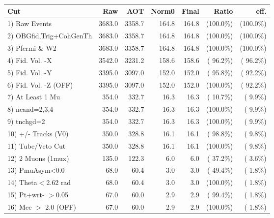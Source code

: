  \begin{table}[h!]\centering
 \begin{tabular}{||l||r|r|r|r|r|r||}
 \hline
 \hline
 Cut & Raw & AOT & Norm0 & Final & Ratio & eff.       \\
 \hline
  1) Raw Events           &       3683.0 &       3358.7 &        164.8 &        164.8 & (100.0\%) & (100.0\%) \\
  2) OBGfid,Trig+CohGenTh &       3683.0 &       3358.7 &        164.8 &        164.8 & (100.0\%) & (100.0\%) \\
  3) Pfermi \& W2         &       3683.0 &       3358.7 &        164.8 &        164.8 & (100.0\%) & (100.0\%) \\
  4) Fid. Vol. -X         &       3542.0 &       3231.2 &        158.6 &        158.6 & ( 96.2\%) & ( 96.2\%) \\
  5) Fid. Vol. -Y         &       3395.0 &       3097.0 &        152.0 &        152.0 & ( 95.8\%) & ( 92.2\%) \\
  6) Fid. Vol. -Z (OFF)   &       3395.0 &       3097.0 &        152.0 &        152.0 & (100.0\%) & ( 92.2\%) \\
  7) At Least 1 Mu        &        354.0 &        332.7 &         16.3 &         16.3 & ( 10.7\%) & (  9.9\%) \\
  8) ncand=2,3,4          &        354.0 &        332.7 &         16.3 &         16.3 & (100.0\%) & (  9.9\%) \\
  9) tnchgd=2             &        354.0 &        332.7 &         16.3 &         16.3 & (100.0\%) & (  9.9\%) \\
 10) +/- Tracks (V0)      &        350.0 &        328.8 &         16.1 &         16.1 & ( 98.8\%) & (  9.8\%) \\
 11) Tube/Veto Cut        &        350.0 &        328.8 &         16.1 &         16.1 & (100.0\%) & (  9.8\%) \\
 12) 2 Muons (1mux)       &        135.0 &        122.3 &          6.0 &          6.0 & ( 37.2\%) & (  3.6\%) \\
 13) PmuAsym<0.0          &         68.0 &         60.4 &          3.0 &          3.0 & ( 49.4\%) & (  1.8\%) \\
 14) Theta$<$2.62 rad     &         68.0 &         60.4 &          3.0 &          3.0 & (100.0\%) & (  1.8\%) \\
 15) Pt+wrt- $>$0.05      &         67.0 &         60.0 &          2.9 &          2.9 & ( 99.4\%) & (  1.8\%) \\
 16) Mee $>$ 2.0  (OFF)   &         67.0 &         60.0 &          2.9 &          2.9 & (100.0\%) & (  1.8\%) \\

\end{tabular}
\end{table}
